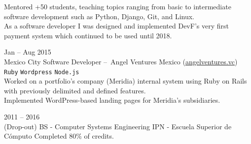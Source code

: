 \documentclass[9pt]{developercv} %
\begin{document}
\begin{entrylist}
{            Mentored +50 students, teaching topics ranging from basic to intermediate software 
            development such as Python, Django, Git, and Linux. \\
            
            As a software developer I was designed and implemented DevF's very first payment system 
            which continued to be used until 2018.
        }

    \entry
        {
            Jan -- Aug 2015
            \\\footnotesize{Mexico City}
        }
        {Software Developer – Angel Ventures Mexico ({\href{http://www.angelventures.vc/}{\underline{angelventures.vc}}})}
        {   
            \texttt{Ruby}
            \slashsep\texttt{Wordpress}
            \slashsep\texttt{Node.js}
        }
        {\\
            Worked on a portfolio's company (Meridia) internal system using Ruby on Rails with 
            previously delimited and defined features. \\

            Implemented WordPress-based landing pages for Meridia's subsidiaries.
        }

\end{entrylist}



\begin{entrylist}
    \entry
        {
            2011 -- 2016
            \\\footnotesize{(Drop-out)}
        }
        {BS - Computer Systems Engineering}
        {IPN - Escuela Superior de Cómputo}
        {Completed 80\% of credits.}
\end{entrylist}

\end{document}
